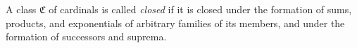 A class $\mathfrak{C}$ of cardinals is called \emph{closed} if it is closed under the formation of sums, products, and exponentials of arbitrary families of its members, and under the formation of successors and suprema.
